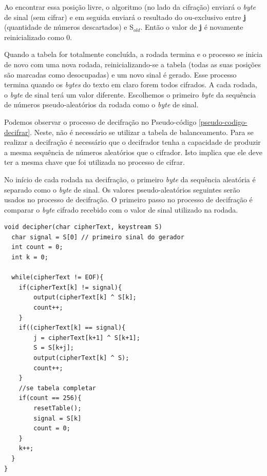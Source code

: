 Ao encontrar essa posição livre, o algoritmo (no lado da cifração) enviará o \textit{byte} de sinal (sem cifrar) e em seguida enviará o resultado do ou-exclusivo entre \textbf{j} (quantidade de números descartados) e S$_{old}$. Então o valor de \textbf{j} é novamente reinicializado como 0.

Quando a tabela for totalmente concluída, a rodada termina e o processo se inicia de novo com uma nova rodada, reinicializando-se a tabela (todas as suas posições são marcadas como desocupadas) e um novo sinal é gerado. Esse processo termina quando os \textit{bytes} do texto em claro forem todos cifrados. A cada rodada, o \textit{byte} de sinal terá um valor diferente. Escolhemos o primeiro \textit{byte} da sequência de números pseudo-aleatórios da rodada como o \textit{byte} de sinal.

Podemos observar o processo de decifração no Pseudo-código \ref{pseudo-codigo-decifrar}. Neste, não é necessário se utilizar a tabela de balanceamento. Para se realizar a decifração é necessário que o decifrador tenha a capacidade de produzir a mesma sequência de números aleatórios que o cifrador. Isto implica que ele deve ter a mesma chave que foi utilizada no processo de cifrar.

No início de cada rodada na decifração, o primeiro \textit{byte} da sequência aleatória é separado como o \textit{byte} de sinal. Os valores pseudo-aleatórios seguintes serão usados no processo de decifração. O primeiro passo no processo de decifração é comparar o \textit{byte} cifrado recebido com o valor de sinal utilizado na rodada. 



    \begin{lstlisting}[caption={Pseudo-Código Decifração}, label=pseudo-codigo-decifrar]
void decipher(char cipherText, keystream S)
  char signal = S[0] // primeiro sinal do gerador
  int count = 0;
  int k = 0;

  while(cipherText != EOF){
	if(cipherText[k] != signal){
		output(cipherText[k] ^ S[k];
		count++;
	}
	if((cipherText[k] == signal){
		j = cipherText[k+1] ^ S[k+1];
		S = S[k+j];
		output(cipherText[k] ^ S);
		count++;
	}
	//se tabela completar
	if(count == 256){
		resetTable();
		signal = S[k]
		count = 0;
	}
	k++;
  }
}
    \end{lstlisting}

